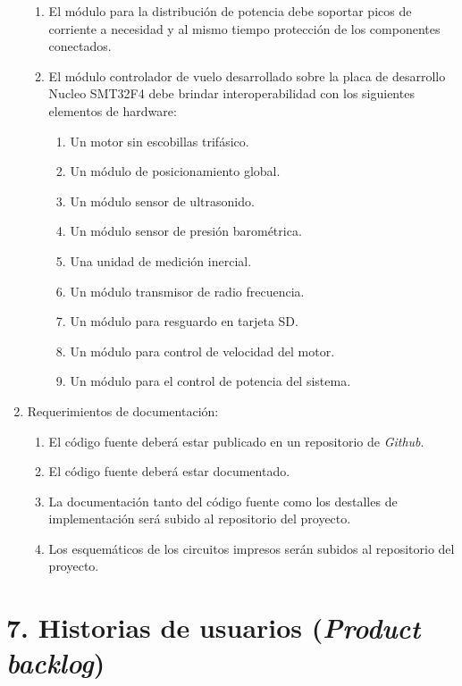 \documentclass[
11pt, %
]{charter}
\begin{document}
\begin{enumerate}
\begin{enumerate}
			      \item El m\'odulo para la distribuci\'on de potencia debe soportar picos de corriente a necesidad y al mismo tiempo protecci\'on de los componentes conectados.
			      \item El m\'odulo controlador de vuelo desarrollado sobre la placa de desarrollo Nucleo SMT32F4 debe brindar interoperabilidad con los siguientes elementos de hardware:
			      \begin{enumerate}
			      	\item Un motor sin escobillas trif\'asico.
			      	\item Un m\'odulo de posicionamiento global.
			      	\item Un m\'odulo sensor de ultrasonido.
  		      	    \item Un m\'odulo sensor de presi\'on barom\'etrica.
  		      	    \item Una unidad de medici\'on inercial.
  		      	    \item Un m\'odulo transmisor de radio frecuencia.
  		      	    \item Un m\'odulo para resguardo en tarjeta SD.
  		      	    \item Un m\'odulo para control de velocidad del motor.
  		      	    \item Un m\'odulo para el control de potencia del sistema. 
			      \end{enumerate}
		     \end{enumerate}
		\item Requerimientos de documentaci\'on:
		      \begin{enumerate}
				  \item El c\'odigo fuente deber\'a estar publicado en un repositorio de \textit{Github}.			      
			      \item El c\'odigo fuente deber\'a estar documentado.
			      \item La documentaci\'on tanto del c\'odigo fuente como los destalles de implementaci\'on ser\'a subido al repositorio del proyecto.
			      \item Los esquem\'aticos de los circuitos impresos ser\'an subidos al repositorio del proyecto.
		      \end{enumerate}
	\end{enumerate}


\section{7. Historias de usuarios (\textit{Product backlog})}
\label{sec:backlog}
\end{document}
